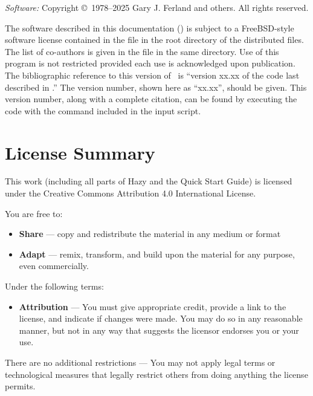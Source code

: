 {\small
\noindent

{\em Software:} Copyright \copyright\ 1978--2025 Gary J. Ferland and others. All rights reserved.

\vspace{1em}

\noindent
The software described in this documentation (\Cloudy) is subject
to a FreeBSD-style software license
contained in the file  in the
root directory of the distributed files.
The list of co-authors is given in the file
 in the same directory.
Use of this program is not restricted provided each use is
acknowledged upon publication.
The bibliographic reference to this version of \Cloudy\ is
``version xx.xx
of the code last described in \citet{C23}.''
The version number, shown here as ``xx.xx'', should be
given.
This version number, along with a complete citation,
can be found by executing the code with the 
 command included in the input script.

\section*{License Summary}

This work (including all parts of Hazy and the Quick Start Guide) is licensed under the Creative Commons Attribution 4.0 International License.

You are free to:
\begin{itemize}
  \item \textbf{Share} — copy and redistribute the material in any medium or format
  \item \textbf{Adapt} — remix, transform, and build upon the material for any purpose, even commercially.
\end{itemize}

Under the following terms:
\begin{itemize}
  \item \textbf{Attribution} — You must give appropriate credit, provide a link to the license, and indicate if changes were made.
    You may do so in any reasonable manner, but not in any way that suggests the licensor endorses you or your use.
\end{itemize}

There are no additional restrictions — You may not apply legal terms or technological measures that legally restrict others from doing anything the license permits.

}
